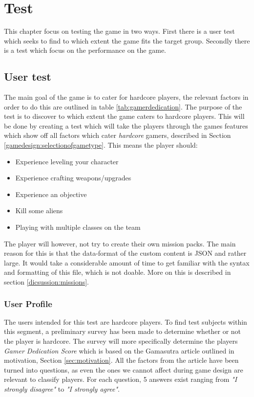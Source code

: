\chapter{Test}
This chapter focus on testing the game in two ways. First there is a user test which seeks to find to which extent the game fits the target group. Secondly there is a test which focus on the performance on the game.

\section{User test}
The main goal of the game is to cater for hardcore players, the relevant factors in order to do this are outlined in table \ref{tab:gamerdedication}.
The purpose of the test is to discover to which extent the game caters to hardcore players.
This will be done by creating a test which will take the players through the games features which show off all factors which cater \emph{hardcore} gamers, described in Section \ref{gamedesign:selectionofgametype}.
This means the player should:
\begin{itemize}
	\item Experience leveling your character
	\item Experience crafting weapons/upgrades
	\item Experience an objective
	\item Kill some aliens
	\item Playing with multiple classes on the team
\end{itemize}

The player will however, not try to create their own mission packs. The main reason for this is that the data-format of the custom content is JSON and rather large. It would take a considerable amount of time to get familiar with the syntax and formatting of this file, which is not doable. More on this is described in section \ref{dicsussion:missions}.

\subsection{User Profile}
The users intended for this test are hardcore players.
To find test subjects within this segment, a preliminary survey has been made to determine whether or not the player is hardcore.
The survey will more specifically determine the players \textit{Gamer Dedication Score} which is based on the Gamasutra article\cite{casual_vs_hardcore} outlined in motivation, Section \ref{sec:motivation}.
All the factors from the article have been turned into questions, as even the ones we cannot affect during game design are relevant to classify players.
For each question, 5 answers exist ranging from \textit{"I strongly disagree"} to \textit{"I strongly agree"}.

